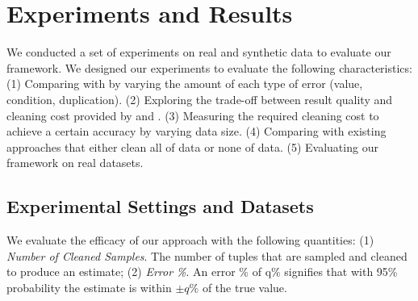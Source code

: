 \section{Experiments and Results}\label{sec:exp}
We conducted a set of experiments on real and synthetic data to evaluate our framework.
We designed our experiments to evaluate the following characteristics:
(1) Comparing \sampleclean with \biascorrected by varying the amount of each type of error (value, condition, duplication).
(2) Exploring the trade-off between result quality and cleaning cost provided by \sampleclean and \biascorrected.
(3) Measuring the required cleaning cost to achieve a certain accuracy by varying data size.
(4) Comparing with existing approaches that either clean all of data or none of data.
(5) Evaluating our framework on real datasets.


\subsection{Experimental Settings and Datasets}\label{subsec:dateset}
We evaluate the efficacy of our approach with the following quantities: (1) \emph{Number of Cleaned Samples}. The number of tuples that are sampled and cleaned to produce an estimate; (2) \emph{Error \%}. An error \% of q\% signifies that with 95\% probability the estimate is within $\pm q\%$ of the true value. 

